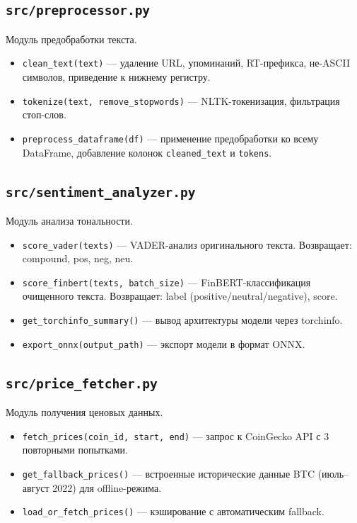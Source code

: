 \documentclass[a4paper,12pt]{article}
\begin{document}
\subsection{\texttt{src/preprocessor.py}}

Модуль предобработки текста.

\begin{itemize}
  \item \texttt{clean\_text(text)} --- удаление URL, упоминаний, RT-префикса,
        не-ASCII символов, приведение к нижнему регистру.
  \item \texttt{tokenize(text, remove\_stopwords)} --- NLTK-токенизация,
        фильтрация стоп-слов.
  \item \texttt{preprocess\_dataframe(df)} --- применение предобработки
        ко всему DataFrame, добавление колонок \texttt{cleaned\_text} и \texttt{tokens}.
\end{itemize}

\subsection{\texttt{src/sentiment\_analyzer.py}}

Модуль анализа тональности.

\begin{itemize}
  \item \texttt{score\_vader(texts)} --- VADER-анализ оригинального текста.
        Возвращает: compound, pos, neg, neu.
  \item \texttt{score\_finbert(texts, batch\_size)} --- FinBERT-классификация
        очищенного текста. Возвращает: label (positive/neutral/negative), score.
  \item \texttt{get\_torchinfo\_summary()} --- вывод архитектуры модели через torchinfo.
  \item \texttt{export\_onnx(output\_path)} --- экспорт модели в формат ONNX.
\end{itemize}

\subsection{\texttt{src/price\_fetcher.py}}

Модуль получения ценовых данных.

\begin{itemize}
  \item \texttt{fetch\_prices(coin\_id, start, end)} --- запрос к CoinGecko API
        с 3 повторными попытками.
  \item \texttt{get\_fallback\_prices()} --- встроенные исторические данные BTC
        (июль--август 2022) для offline-режима.
  \item \texttt{load\_or\_fetch\_prices()} --- кэширование с автоматическим fallback.
\end{itemize}
\end{document}
